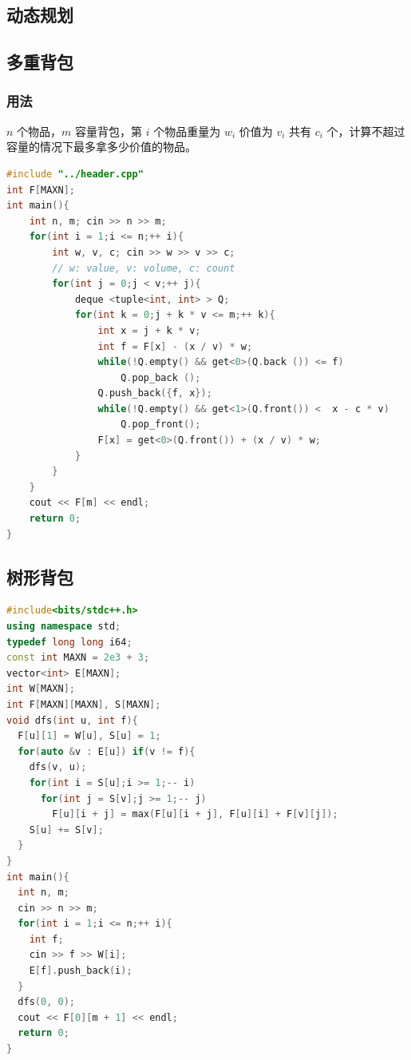 \documentclass[10pt]{ctexart}
\begin{document}
\newpage

\begin{multicols}{3}
    \setcounter{page}{1}

    \tableofcontents
    
    \section{动态规划}\label{ux52a8ux6001ux89c4ux5212}

    \subsection{多重背包}\label{ux591aux91cdux80ccux5305}

    \subsubsection{用法}\label{ux7528ux6cd5}

    \(n\) 个物品，\(m\) 容量背包，第 \(i\) 个物品重量为 \(w_i\) 价值为
    \(v_i\) 共有 \(c_i\)
    个，计算不超过容量的情况下最多拿多少价值的物品。

\begin{lstlisting}[language={C++}]
#include "../header.cpp"
int F[MAXN];
int main(){
    int n, m; cin >> n >> m;
    for(int i = 1;i <= n;++ i){
        int w, v, c; cin >> w >> v >> c;
        // w: value, v: volume, c: count
        for(int j = 0;j < v;++ j){
            deque <tuple<int, int> > Q;
            for(int k = 0;j + k * v <= m;++ k){
                int x = j + k * v;
                int f = F[x] - (x / v) * w;
                while(!Q.empty() && get<0>(Q.back ()) <= f)
                    Q.pop_back ();
                Q.push_back({f, x});
                while(!Q.empty() && get<1>(Q.front()) <  x - c * v)
                    Q.pop_front();
                F[x] = get<0>(Q.front()) + (x / v) * w;
            }
        }
    }
    cout << F[m] << endl;
    return 0;
}
\end{lstlisting}

    \subsection{树形背包}\label{ux6811ux5f62ux80ccux5305}

\begin{lstlisting}[language={C++}]
#include<bits/stdc++.h>
using namespace std;
typedef long long i64;
const int MAXN = 2e3 + 3;
vector<int> E[MAXN];
int W[MAXN];
int F[MAXN][MAXN], S[MAXN];
void dfs(int u, int f){
  F[u][1] = W[u], S[u] = 1;
  for(auto &v : E[u]) if(v != f){
    dfs(v, u);
    for(int i = S[u];i >= 1;-- i)
      for(int j = S[v];j >= 1;-- j)
        F[u][i + j] = max(F[u][i + j], F[u][i] + F[v][j]);
    S[u] += S[v];
  }
}
int main(){
  int n, m;
  cin >> n >> m;
  for(int i = 1;i <= n;++ i){
    int f;
    cin >> f >> W[i];
    E[f].push_back(i);
  }
  dfs(0, 0);
  cout << F[0][m + 1] << endl;
  return 0;
}
\end{lstlisting}


\end{multicols}
\end{document}
